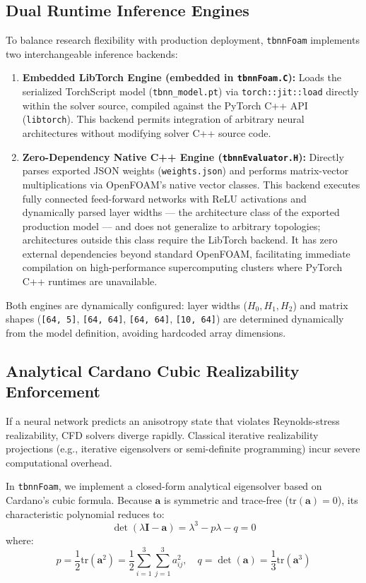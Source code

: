 \documentclass[11pt,a4paper]{article}
\begin{document}
\subsection{Dual Runtime Inference Engines}
To balance research flexibility with production deployment, \texttt{tbnnFoam} implements two interchangeable inference backends:
\begin{enumerate}
    \item \textbf{Embedded LibTorch Engine (embedded in \texttt{tbnnFoam.C}):} Loads the serialized TorchScript model (\texttt{tbnn\_model.pt}) via \texttt{torch::jit::load} directly within the solver source, compiled against the PyTorch C++ API (\texttt{libtorch}). This backend permits integration of arbitrary neural architectures without modifying solver C++ source code.
    \item \textbf{Zero-Dependency Native C++ Engine (\texttt{tbnnEvaluator.H}):} Directly parses exported JSON weights (\texttt{weights.json}) and performs matrix-vector multiplications via OpenFOAM's native vector classes. This backend executes fully connected feed-forward networks with ReLU activations and dynamically parsed layer widths --- the architecture class of the exported production model --- and does not generalize to arbitrary topologies; architectures outside this class require the LibTorch backend. It has zero external dependencies beyond standard OpenFOAM, facilitating immediate compilation on high-performance supercomputing clusters where PyTorch C++ runtimes are unavailable.
\end{enumerate}

Both engines are dynamically configured: layer widths ($H_0, H_1, H_2$) and matrix shapes (\texttt{[64, 5]}, \texttt{[64, 64]}, \texttt{[64, 64]}, \texttt{[10, 64]}) are determined dynamically from the model definition, avoiding hardcoded array dimensions.

\subsection{Analytical Cardano Cubic Realizability Enforcement}
If a neural network predicts an anisotropy state that violates Reynolds-stress realizability, CFD solvers diverge rapidly. Classical iterative realizability projections (e.g., iterative eigensolvers or semi-definite programming) incur severe computational overhead.

In \texttt{tbnnFoam}, we implement a closed-form analytical eigensolver based on Cardano's cubic formula. Because $\mathbf{a}$ is symmetric and trace-free ($\mathrm{tr}(\mathbf{a}) = 0$), its characteristic polynomial reduces to:
\begin{equation}
\det(\lambda\mathbf{I} - \mathbf{a}) = \lambda^3 - p\lambda - q = 0
\end{equation}
where:
\begin{equation}
p = \frac{1}{2}\mathrm{tr}(\mathbf{a}^2) = \frac{1}{2}\sum_{i=1}^3 \sum_{j=1}^3 a_{ij}^2, \quad q = \det(\mathbf{a}) = \frac{1}{3}\mathrm{tr}(\mathbf{a}^3)
\end{equation}
\end{document}
